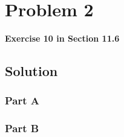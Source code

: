 
\begingroup
\allowdisplaybreaks

\newpage
\section{Problem 2}

\textbf{Exercise 10 in Section 11.6}

\subsection{Solution}

\subsubsection{Part A}


\subsubsection{Part B}

